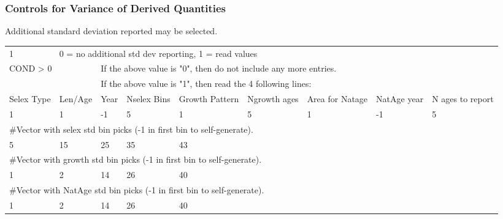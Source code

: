 \subsubsection{Controls for Variance of Derived Quantities}
Additional standard deviation reported may be selected.
\begin{center}
	\begin{longtable}{p{1cm} p{1.2cm} p{1.2cm} p{1.2cm} p{1.2cm} p{1.2cm} p{1.5cm} p{1.5cm} p{1.8cm}}
		\hline
		1 & \multicolumn{8}{l}{0 = no additional std dev reporting, 1 = read values}\\
		\multicolumn{2}{l}{COND > 0} & \multicolumn{7}{l}{If the above value is "0", then do not include any more entries.}\\
		  & & \multicolumn{7}{l}{If the above value is "1", then read the 4 following lines:}\\
		Selex Type & Len/Age & Year & Nselex Bins & Growth Pattern & Ngrowth ages & Area for Natage & NatAge year  & N ages to report\\
		\hline
		1 & 1 & -1 & 5 & 1 & 5 & 1 & -1 & 5\\ 
		\hline
		\multicolumn{9}{l}{\#Vector with selex std bin picks (-1 in first bin to self-generate).} \\
		5 & 15 & 25 & 35 & 43 & & & & \\
		\hline
		\multicolumn{9}{l}{\#Vector with growth std bin picks (-1 in first bin to self-generate).} \\	
		1 & 2 & 14 & 26 & 40 & & & & \\	
		\hline
		\multicolumn{9}{l}{\#Vector with NatAge std bin picks (-1 in first bin to self-generate).} \\	
		1 & 2 & 14 & 26 & 40 & & & & \\			
		\hline
	\end{longtable}
\end{center}

